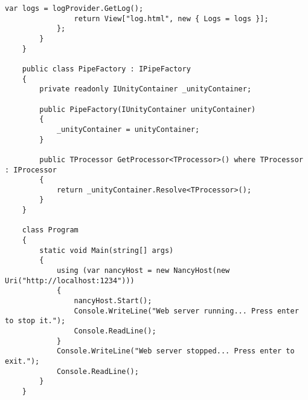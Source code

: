 \begin{lstlisting}[style=fsharpstyle,caption={Исходный код}, label=lst:recognition_result_handler]
                var logs = logProvider.GetLog();
                return View["log.html", new { Logs = logs }];
            };
        }
    }

    public class PipeFactory : IPipeFactory
    {
        private readonly IUnityContainer _unityContainer;

        public PipeFactory(IUnityContainer unityContainer)
        {
            _unityContainer = unityContainer;
        }

        public TProcessor GetProcessor<TProcessor>() where TProcessor : IProcessor
        {
            return _unityContainer.Resolve<TProcessor>();
        }
    }

    class Program
    {
        static void Main(string[] args)
        {
            using (var nancyHost = new NancyHost(new Uri("http://localhost:1234")))
            {
                nancyHost.Start();
                Console.WriteLine("Web server running... Press enter to stop it.");
                Console.ReadLine();
            }
            Console.WriteLine("Web server stopped... Press enter to exit.");
            Console.ReadLine();
        }
    }



\end{lstlisting}